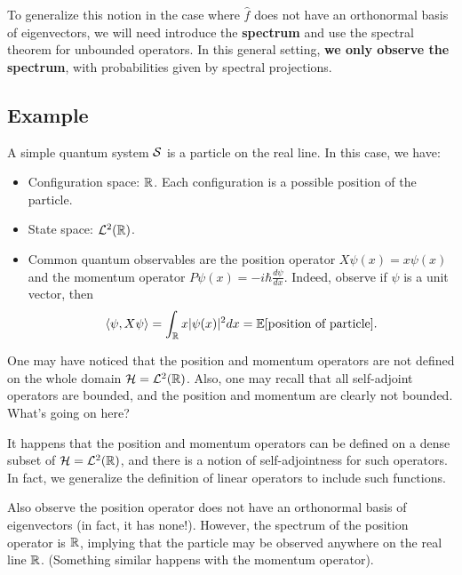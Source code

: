 To generalize this notion in the case where $\hat{f}$ does not have an orthonormal basis of eigenvectors, we will need introduce the \textbf{spectrum} and use the spectral theorem for unbounded operators. In this general setting, \textbf{we only observe the spectrum}, with probabilities given by spectral projections.

\subsection{Example}
A simple quantum system ${\mathcal S}$ is a particle on the real line. In this case, we have:
\begin{itemize}
    \item Configuration space: ${\mathbb R}$. Each configuration is a possible position of the particle.
    \item State space: ${\mathcal L}^2({\mathbb R})$.
    \item Common quantum observables are the position operator $X\psi(x) = x\psi(x)$ and the momentum operator $P\psi(x) = -i\hbar\frac{d\psi}{dx}$. Indeed, observe if $\psi$ is a unit vector, then
    \[
        \langle \psi, X\psi \rangle = \int_{\mathbb R} x|\psi(x)|^2dx = \mathbb E[\text{position of particle}].
    \]
\end{itemize}
One may have noticed that the position and momentum operators are not defined on the whole domain ${\mathcal H} = {\mathcal L}^2({\mathbb R})$. Also, one may recall that all self-adjoint operators are bounded, and the position and momentum are clearly not bounded. What's going on here?

It happens that the position and momentum operators can be defined on a dense subset of ${\mathcal H} = {\mathcal L}^2({\mathbb R})$, and there is a notion of self-adjointness for such operators. In fact, we generalize the definition of linear operators to include such functions.

Also observe the position operator does not have an orthonormal basis of eigenvectors (in fact, it has none!). However, the spectrum of the position operator is ${\mathbb R}$, implying that the particle may be observed anywhere on the real line ${\mathbb R}$. (Something similar happens with the momentum operator).